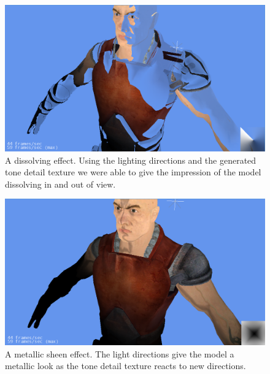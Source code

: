 \documentclass[annual]{acmsiggraph}
\begin{document}
\begin{figure}[h]
 \centering
 \includegraphics[width=5.5in]{images/dissolve}
 \caption{A dissolving effect. Using the lighting directions and the generated tone detail texture we were able to give the impression of the model dissolving in and out of view.}
 \label{fig:dissolve}
\end{figure}

\begin{figure}[h]
 \centering
 \includegraphics[width=5.5in]{images/metallic}
 \caption{A metallic sheen effect. The light directions give the model a metallic look as the tone detail texture reacts to new directions.}
 \label{fig:metallic}
\end{figure}
\end{document}
